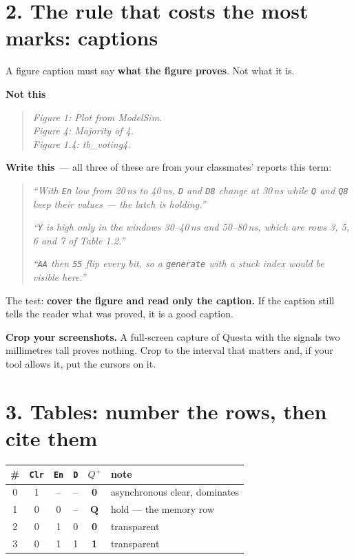 \documentclass[11pt]{article}
\newcommand{\code}[1]{\texttt{#1}}
\newcommand{\yes}{\textcolor{good}{\textbf{Write this}}}
\newcommand{\no}{\textcolor{bad}{\textbf{Not this}}}
\begin{document}
\section*{2. The rule that costs the most marks: captions}

A figure caption must say \textbf{what the figure proves}. Not what it is.

\vspace{4pt}
\no
\begin{quote}
\emph{Figure 1: Plot from ModelSim.}\\
\emph{Figure 4: Majority of 4.}\\
\emph{Figure 1.4: tb\_voting4.}
\end{quote}

\yes\ --- all three of these are from your classmates' reports this term:
\begin{quote}
\emph{``With \code{En} low from 20\,ns to 40\,ns, \code{D} and \code{D8} change at
30\,ns while \code{Q} and \code{Q8} keep their values --- the latch is holding.''}

\emph{``\code{Y} is high only in the windows 30--40\,ns and 50--80\,ns, which are
rows 3, 5, 6 and 7 of Table 1.2.''}

\emph{``\code{AA} then \code{55} flip every bit, so a \code{generate} with a stuck
index would be visible here.''}
\end{quote}

The test: \textbf{cover the figure and read only the caption.} If the caption still
tells the reader what was proved, it is a good caption.

\textbf{Crop your screenshots.} A full-screen capture of Questa with the signals
two millimetres tall proves nothing. Crop to the interval that matters and, if your
tool allows it, put the cursors on it.

\section*{3. Tables: number the rows, then cite them}

\begin{center}
\begin{tabular}{c|ccc|c|l}
\toprule
\# & \code{Clr} & \code{En} & \code{D} & $Q^{+}$ & note \\
\midrule
0 & 1 & -- & -- & \textbf{0} & asynchronous clear, dominates \\
1 & 0 & 0 & -- & $\mathbf{Q}$ & hold --- the memory row \\
2 & 0 & 1 & 0 & \textbf{0} & transparent \\
3 & 0 & 1 & 1 & \textbf{1} & transparent \\
\bottomrule
\end{tabular}
\end{center}
\end{document}
